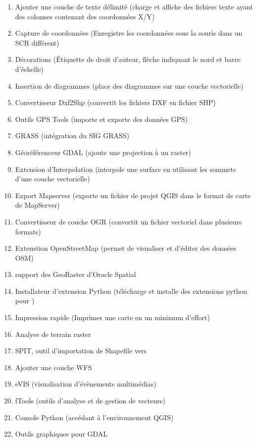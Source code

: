 
\begin{enumerate}
\item Ajouter une couche de texte délimité (charge et affiche des fichiers texte ayant des colonnes contenant des coordonnées X/Y)
\item Capture de coordonnées (Enregistre les coordonnées sous la souris dans un SCR différent)
\item Décorations (Étiquette de droit d'auteur, flèche indiquant le nord et barre d'échelle)
\item Insertion de diagrammes (place des diagrammes sur une couche vectorielle)
\item Convertisseur Dxf2Shp (convertit les fichiers DXF en fichier SHP)
\item Outils GPS Tools (importe et exporte des données GPS)
\item GRASS (intégration du SIG GRASS)
\item Géoréférenceur GDAL (ajoute une projection à un raster)
\item Extension d'Interpolation (interpole une surface en utilisant les sommets d'une couche vectorielle)
\item Export Mapserver (exporte un fichier de projet QGIS dans le format de carte de MapServer)
\item Convertisseur de couche OGR (convertit un fichier vectoriel dans plusieurs formats)
\item Extenstion OpenStreetMap (permet de visualiser et d'éditer des données OSM)
\item support des GeoRaster d'Oracle Spatial
\item Installateur d'extension Python (télécharge et installe des extensions python pour \qg)
\item Impression rapide (Imprimer une carte en un minimum d'effort)
\item Analyse de terrain raster
\item SPIT, outil d'importation de Shapefile vers \ppg
\item Ajouter une couche WFS 
\item eVIS (visualisation d'évènements multimédias)
\item fTools (outils d'analyse et de gestion de vecteurs)
\item Console Python (accédant à l'environnement QGIS)
\item Outils graphiques pour GDAL
\end{enumerate}

